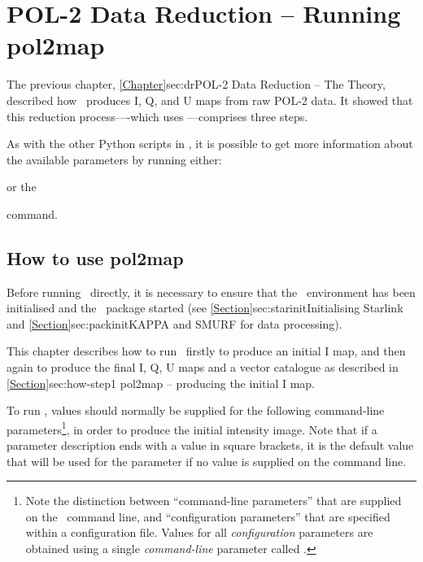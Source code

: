 \chapter{POL-2 Data Reduction -- Running
  pol2map}
\label{sec:rundr}

The previous chapter, \cref{Chapter}{sec:dr}{POL-2 Data Reduction --
  The Theory}, described how \poltwomap\ produces I, Q, and U maps from raw
POL-2 data.  It showed that this reduction process----which uses
\poltwomap---comprises three steps.

As with the other Python scripts in \SMURF, it is possible to get more
information about the available parameters by running either:
\begin{terminalv}
\end{terminalv}
or the
\begin{terminalv}
\end{terminalv}
command.

\section{How to use pol2map}

Before running \poltwomap\ directly, it is necessary to ensure that
the \starlink\ environment has been initialised and the \smurf\
package started (see \cref{Section}{sec:starinit}{Initialising
  Starlink} and \cref{Section}{sec:packinit}{KAPPA and SMURF for data
  processing}).

This chapter describes how to run \poltwomap\ firstly to produce an
initial I map, and then again to produce the final I, Q, U maps and a
vector catalogue as described in \cref{Section}{sec:how-step1}{
pol2map -- producing the initial I map}.

To run \poltwomap, values should normally be supplied for the following
command-line parameters\footnote{Note the distinction between
  ``command-line parameters'' that are supplied on the
  \poltwomap\ command line, and ``configuration parameters'' that
  are specified within a configuration file. Values for all
  \emph{configuration} parameters are obtained using a single
  \emph{command-line} parameter called .}, in order to
  produce the initial intensity image. Note that if a parameter description ends
  with a value in square brackets, it is the default value that will be used for
the parameter if no value is supplied on the command line.

